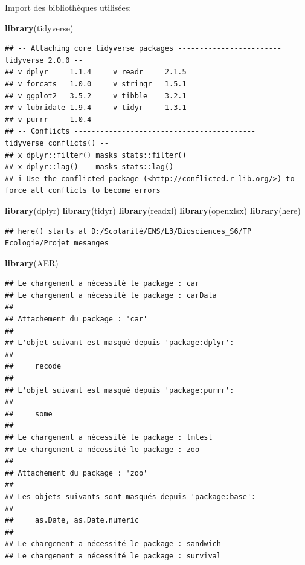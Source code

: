 \documentclass[
  french,
]{article}
\newenvironment{Shaded}{\begin{snugshade}}{\end{snugshade}}
\newcommand{\FunctionTok}[1]{\textcolor[rgb]{0.13,0.29,0.53}{\textbf{#1}}}
\newcommand{\NormalTok}[1]{#1}
\begin{document}
Import des bibliothèques utilisées:

\begin{Shaded}
\begin{Highlighting}[]
\FunctionTok{library}\NormalTok{(tidyverse)}
\end{Highlighting}
\end{Shaded}

\begin{verbatim}
## -- Attaching core tidyverse packages ------------------------ tidyverse 2.0.0 --
## v dplyr     1.1.4     v readr     2.1.5
## v forcats   1.0.0     v stringr   1.5.1
## v ggplot2   3.5.2     v tibble    3.2.1
## v lubridate 1.9.4     v tidyr     1.3.1
## v purrr     1.0.4     
## -- Conflicts ------------------------------------------ tidyverse_conflicts() --
## x dplyr::filter() masks stats::filter()
## x dplyr::lag()    masks stats::lag()
## i Use the conflicted package (<http://conflicted.r-lib.org/>) to force all conflicts to become errors
\end{verbatim}

\begin{Shaded}
\begin{Highlighting}[]
\FunctionTok{library}\NormalTok{(dplyr)}
\FunctionTok{library}\NormalTok{(tidyr)}
\FunctionTok{library}\NormalTok{(readxl)}
\FunctionTok{library}\NormalTok{(openxlsx)}
\FunctionTok{library}\NormalTok{(here)}
\end{Highlighting}
\end{Shaded}

\begin{verbatim}
## here() starts at D:/Scolarité/ENS/L3/Biosciences_S6/TP Ecologie/Projet_mesanges
\end{verbatim}

\begin{Shaded}
\begin{Highlighting}[]
\FunctionTok{library}\NormalTok{(AER)}
\end{Highlighting}
\end{Shaded}

\begin{verbatim}
## Le chargement a nécessité le package : car
## Le chargement a nécessité le package : carData
## 
## Attachement du package : 'car'
## 
## L'objet suivant est masqué depuis 'package:dplyr':
## 
##     recode
## 
## L'objet suivant est masqué depuis 'package:purrr':
## 
##     some
## 
## Le chargement a nécessité le package : lmtest
## Le chargement a nécessité le package : zoo
## 
## Attachement du package : 'zoo'
## 
## Les objets suivants sont masqués depuis 'package:base':
## 
##     as.Date, as.Date.numeric
## 
## Le chargement a nécessité le package : sandwich
## Le chargement a nécessité le package : survival
\end{verbatim}
\end{document}

